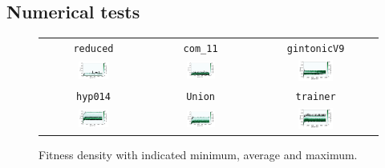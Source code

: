 \documentclass[11pt,a4paper]{scrartcl}
\begin{document}
\subsection{Numerical tests}

\begin{figure}[H]
\center
\begin{tabular}{ccc}
\texttt{reduced} & \texttt{com\_11} & \texttt{gintonicV9} \\
\includegraphics[width=0.3\textwidth]{img/standard_reduced.png} &
\includegraphics[width=0.3\textwidth]{img/standard_com_11.png} &
\includegraphics[width=0.3\textwidth]{img/standard_gintonicV9.png} \\
\texttt{hyp014} & \texttt{Union} & \texttt{trainer} \\
\includegraphics[width=0.3\textwidth]{img/standard_hyp014.png} &
\includegraphics[width=0.3\textwidth]{img/standard_Union.png} &
\includegraphics[width=0.3\textwidth]{img/standard_trainer.png}
\end{tabular}
\caption{Fitness density with indicated minimum, average and maximum.}
\label{fig:standard}
\end{figure}
\end{document}
